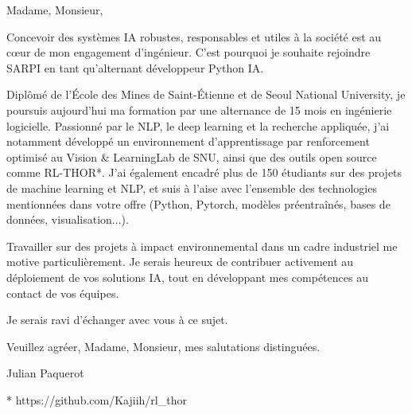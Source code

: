 Madame, Monsieur,

Concevoir des systèmes IA robustes, responsables et utiles à la société est au cœur de mon engagement d'ingénieur. C'est pourquoi je souhaite rejoindre SARPI en tant qu'alternant développeur Python IA.

Diplômé de l'École des Mines de Saint-Étienne et de Seoul National University, je poursuis aujourd'hui ma formation par une alternance de 15 mois en ingénierie logicielle. Passionné par le NLP, le deep learning et la recherche appliquée, j'ai notamment développé un environnement d'apprentissage par renforcement optimisé au Vision & LearningLab de SNU, ainsi que des outils open source comme RL-THOR*. J'ai également encadré plus de 150 étudiants sur des projets de machine learning et NLP, et suis à l'aise avec l'ensemble des technologies mentionnées dans votre offre (Python, Pytorch, modèles préentraînés, bases de données, visualisation...).

Travailler sur des projets à impact environnemental dans un cadre industriel me motive particulièrement. Je serais heureux de contribuer activement au déploiement de vos solutions IA, tout en développant mes compétences au contact de vos équipes.

Je serais ravi d'échanger avec vous à ce sujet.

Veuillez agréer, Madame, Monsieur, mes salutations distinguées.

Julian Paquerot

* https://github.com/Kajiih/rl_thor
